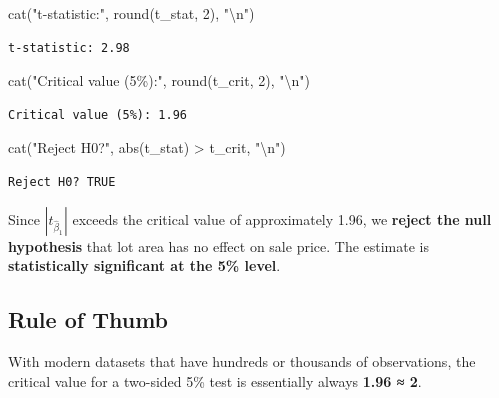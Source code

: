\documentclass[
  letterpaper,
  DIV=11,
  numbers=noendperiod]{scrreprt}
\newenvironment{Shaded}{\begin{snugshade}}{\end{snugshade}}
\newcommand{\DecValTok}[1]{\textcolor[rgb]{0.68,0.00,0.00}{#1}}
\newcommand{\FunctionTok}[1]{\textcolor[rgb]{0.28,0.35,0.67}{#1}}
\newcommand{\NormalTok}[1]{\textcolor[rgb]{0.00,0.23,0.31}{#1}}
\newcommand{\SpecialCharTok}[1]{\textcolor[rgb]{0.37,0.37,0.37}{#1}}
\newcommand{\StringTok}[1]{\textcolor[rgb]{0.13,0.47,0.30}{#1}}
\begin{document}
\begin{Shaded}
\begin{Highlighting}[]
\FunctionTok{cat}\NormalTok{(}\StringTok{"t{-}statistic:"}\NormalTok{, }\FunctionTok{round}\NormalTok{(t\_stat, }\DecValTok{2}\NormalTok{), }\StringTok{"}\SpecialCharTok{\textbackslash{}n}\StringTok{"}\NormalTok{)}
\end{Highlighting}
\end{Shaded}

\begin{verbatim}
t-statistic: 2.98 
\end{verbatim}

\begin{Shaded}
\begin{Highlighting}[]
\FunctionTok{cat}\NormalTok{(}\StringTok{"Critical value (5\%):"}\NormalTok{, }\FunctionTok{round}\NormalTok{(t\_crit, }\DecValTok{2}\NormalTok{), }\StringTok{"}\SpecialCharTok{\textbackslash{}n}\StringTok{"}\NormalTok{)}
\end{Highlighting}
\end{Shaded}

\begin{verbatim}
Critical value (5%): 1.96 
\end{verbatim}

\begin{Shaded}
\begin{Highlighting}[]
\FunctionTok{cat}\NormalTok{(}\StringTok{"Reject H0?"}\NormalTok{, }\FunctionTok{abs}\NormalTok{(t\_stat) }\SpecialCharTok{\textgreater{}}\NormalTok{ t\_crit, }\StringTok{"}\SpecialCharTok{\textbackslash{}n}\StringTok{"}\NormalTok{)}
\end{Highlighting}
\end{Shaded}

\begin{verbatim}
Reject H0? TRUE 
\end{verbatim}

Since \(|t_{\hat{\beta}_1}|\) exceeds the critical value of
approximately 1.96, we \textbf{reject the null hypothesis} that lot area
has no effect on sale price. The estimate is \textbf{statistically
significant at the 5\% level}.

\subsection{Rule of Thumb}\label{rule-of-thumb}

With modern datasets that have hundreds or thousands of observations,
the critical value for a two-sided 5\% test is essentially always
\textbf{1.96 ≈ 2}.
\end{document}
